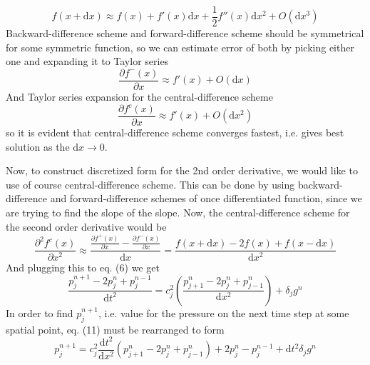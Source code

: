 \documentclass[]{article}
\begin{document}
\begin{equation}
	f\left(x+\textrm{d}x\right)\approx f\left(x\right)+f'\left(x\right)\textrm{d}x+\frac{1}{2}f''\left(x\right)\textrm{d}x^2+O\left(\textrm{d}x^3\right)
\end{equation}
Backward-difference scheme and forward-difference scheme should be symmetrical for some symmetric function, so we can estimate error of both by picking either one and expanding it to Taylor series
\begin{equation*}
	\frac{\partial f^-\left(x\right)}{\partial x}\approx f'\left(x\right)+O\left(\textrm{d}x\right)
\end{equation*}
And Taylor series expansion for the central-difference scheme
\begin{equation*}
	\frac{\partial f^c\left(x\right)}{\partial x}\approx f'\left(x\right)+O\left(\textrm{d}x^2\right)
\end{equation*}
so it is evident that central-difference scheme converges fastest, i.e. gives best solution as the $\textrm{d}x\rightarrow 0$. \par
Now, to construct discretized form for the 2nd order derivative, we would like to use of course central-difference scheme. This can be done by using backward-difference and forward-difference schemes of once differentiated function, since we are trying to find the slope of the slope. Now, the central-difference scheme for the second order derivative would be 
\begin{equation*}
	\frac{\partial^2 f^c\left(x\right)}{\partial x^2}\approx \frac{\frac{\partial f^+\left(x\right)}{\partial x}-\frac{\partial f^-\left(x\right)}{\partial x}}{\textrm{d}x}=\frac{f\left(x+\textrm{d}x\right)-2f\left(x\right)+f\left(x-\textrm{d}x\right)}{\textrm{d}x^2}
\end{equation*}
And plugging this to eq. (6) we get
\begin{equation}
	\frac{p_j^{n+1}-2p_j^n+p_j^{n-1}}{\textrm{d}t^2}=c^2_j\left(\frac{p_{j+1}^n-2p_j^n+p_{j-1}^n}{\textrm{d}x^2}\right)+\delta_j g^n
\end{equation}
In order to find $p_j^{n+1}$, i.e. value for the pressure on the next time step at some spatial point, eq. (11) must be rearranged to form
\begin{equation}
	p_j^{n+1}=c_j^2\frac{\textrm{d}t^2}{\textrm{d}x^2}\left(p^n_{j+1}-2p^n_j+p^n_{j-1}\right)+2p^n_j-p_j^{n-1}+\textrm{d}t^2\delta_j g^n	
\end{equation}
\end{document}
